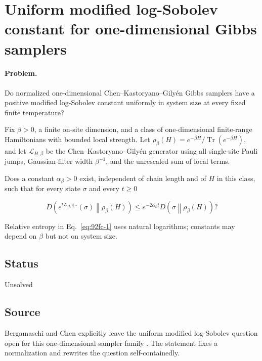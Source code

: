 \section{Uniform modified log-Sobolev constant for one-dimensional Gibbs samplers}
\label{sec:op_92fc12b81d55a704}

\paragraph{Problem.}
Do normalized one-dimensional Chen--Kastoryano--Gily\'en Gibbs samplers have a positive modified log-Sobolev constant uniformly in system size at every fixed finite temperature?

Fix $\beta>0$, a finite on-site dimension, and a class of one-dimensional finite-range Hamiltonians with bounded local strength. Let $\rho_\beta(H)=e^{-\beta H}/\operatorname{Tr}(e^{-\beta H})$, and let $\mathcal L_{H,\beta}$ be the Chen--Kastoryano--Gily\'en generator using all single-site Pauli jumps, Gaussian-filter width $\beta^{-1}$, and the unrescaled sum of local terms.

Does a constant $\alpha_\beta>0$ exist, independent of chain length and of $H$ in this class, such that for every state $\sigma$ and every $t\geq0$

\begin{equation}
D\!\left(e^{t\mathcal L_{H,\beta,*}}(\sigma)\middle\|\rho_\beta(H)\right)
\leq e^{-2\alpha_\beta t}D\!\left(\sigma\middle\|\rho_\beta(H)\right)?
\label{eq:92fc-1}
\end{equation}

Relative entropy in Eq.~\eqref{eq:92fc-1} uses natural logarithms; constants may depend on $\beta$ but not on system size.

\subsection*{Status}

Unsolved

\subsection*{Source}

Bergamaschi and Chen explicitly leave the uniform modified log-Sobolev question open for this one-dimensional sampler family . The statement fixes a normalization and rewrites the question self-containedly.


